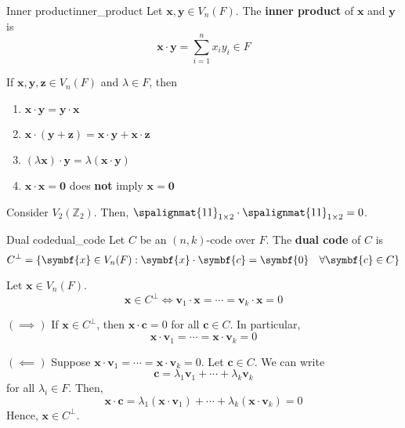 \begin{Definition}{Inner product}{inner_product}
    Let $ \symbf{x},\symbf{y}\in V_n(F) $. The \textbf{inner product}
    of $ \symbf{x} $ and $ \symbf{y} $ is
    \[ \symbf{x}\cdot \symbf{y}=\sum\limits_{i=1}^{n} x_i y_i\in F \]
\end{Definition}

\begin{Theorem}{}{}
    If $ \symbf{x},\symbf{y},\symbf{z}\in V_n(F) $ and $ \lambda\in F $, then
    \begin{enumerate}[label=(\arabic*)]
        \item $ \symbf{x}\cdot \symbf{y}=\symbf{y}\cdot \symbf{x} $
        \item $ \symbf{x}\cdot (\symbf{y}+\symbf{z})=\symbf{x}\cdot \symbf{y}+\symbf{x}\cdot \symbf{z} $
        \item $ (\lambda \symbf{x})\cdot \symbf{y}=\lambda(\symbf{x}\cdot \symbf{y}) $
        \item $ \symbf{x}\cdot \symbf{x}=\symbf{0}$ does \textbf{not} imply $ \symbf{x}=\symbf{0} $
    \end{enumerate}
\end{Theorem}

\begin{Example}{}{}
    Consider $ V_2(\mathbb{Z}_2) $. Then,
    $ \spalignmat{1 1}_{1\times 2}\cdot\spalignmat{1 1}_{1\times 2}=0 $.
\end{Example}

\begin{Definition}{Dual code}{dual_code}
    Let $ C $ be an $ (n,k) $-code over $ F $. The \textbf{dual code}
    of $ C $ is
    \[ C^{\perp}=\set{\symbf{x}\in V_n(F):\symbf{x}\cdot \symbf{c}=\symbf{0}\quad\forall \symbf{c}\in C} \]
\end{Definition}

\begin{Theorem}{}{}
    Let $ \symbf{x}\in V_n(F) $.
    \[ \symbf{x}\in C^{\perp}\iff \symbf{v}_1\cdot \symbf{x}=\cdots =\symbf{v}_k\cdot \symbf{x}=0 \]
\end{Theorem}

\begin{Proof}{}{}
    $ (\implies) $ If $ \symbf{x}\in C^{\perp} $, then $ \symbf{x}\cdot \symbf{c}=0 $ for all
    $ \symbf{c}\in C $. In particular,
    \[ \symbf{x}\cdot \symbf{v}_1=\cdots =\symbf{x}\cdot \symbf{v}_k=0 \]

    $ (\impliedby) $ Suppose $ \symbf{x}\cdot \symbf{v}_1=\cdots =\symbf{x}\cdot \symbf{v}_k=0 $. Let $ \symbf{c}\in C $.
    We can write
    \[ \symbf{c}=\lambda_1\symbf{v}_1+\cdots+\lambda_k\symbf{v}_k \]
    for all $ \lambda_i\in F $. Then,
    \[ \symbf{x}\cdot \symbf{c}=\lambda_1(\symbf{x}\cdot \symbf{v}_1)+\cdots+\lambda_k(\symbf{x}\cdot \symbf{v}_k)=0 \]
    Hence, $ \symbf{x}\in C^{\perp} $.
\end{Proof}

